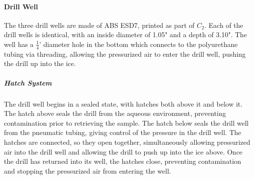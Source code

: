 \documentclass{article}
\begin{document}
\paragraph{Drill Well}
The three drill wells are made of ABS ESD7, printed as part of $C_2$. Each of the drill wells is identical, with an inside diameter of 1.05" and a depth of 3.10". The well has a $\frac{1}{4}$' diameter hole in the bottom which connects to the polyurethane tubing via threading, allowing the pressurized air to enter the drill well, pushing the drill up into the ice.
\subparagraph{Hatch System}
The drill well begins in a sealed state, with hatches both above it and below it. The hatch above seals the drill from the aqueous environment, preventing contamination prior to retrieving the sample. The hatch below seals the drill well from the pneumatic tubing, giving control of the pressure in the drill well. The hatches are connected, so they open together, simultaneously allowing pressurized air into the drill well and allowing the drill to push up into the ice above. Once the drill has returned into its well, the hatches close, preventing contamination and stopping the pressurized air from entering the well.
\end{document}
